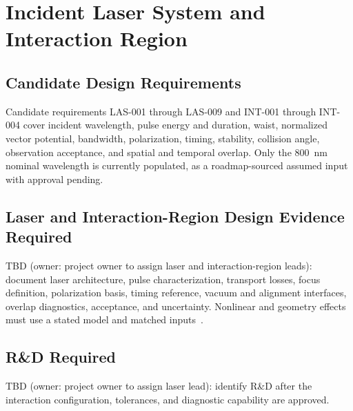 \section{Incident Laser System and Interaction Region}

\subsection{Candidate Design Requirements}

Candidate requirements LAS-001 through LAS-009 and INT-001 through INT-004
cover incident wavelength, pulse energy and duration, waist, normalized vector
potential, bandwidth, polarization, timing, stability, collision angle, observation
acceptance, and spatial and temporal overlap. Only the 800~nm nominal wavelength
is currently populated, as a roadmap-sourced assumed input with approval pending.

\subsection{Laser and Interaction-Region Design Evidence Required}

TBD (owner: project owner to assign laser and interaction-region leads): document
laser architecture, pulse characterization, transport losses, focus definition,
polarization basis, timing reference, vacuum and alignment interfaces, overlap
diagnostics, acceptance, and uncertainty. Nonlinear and geometry effects must use
a stated model and matched inputs~\cite{KrafftEtAl2005NonlinearThomson,HartemannWu2013Brightness}.

\subsection{R\&D Required}

TBD (owner: project owner to assign laser lead): identify R\&D after the
interaction configuration, tolerances, and diagnostic capability are approved.

\blankline
\blankline
